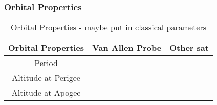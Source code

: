 \documentclass[Space3_Assign1.tex]{subfiles}
\begin{document}
\subsubsection{Orbital Properties}
\begin{table}[h]
\centering
\caption{Orbital Properties - maybe put in classical parameters}
\begin{tabular}{|c|c|c|}
\hline
Orbital Properties & Van Allen Probe & Other sat \\\hline
Period & & \\\hline
Altitude at Perigee & & \\\hline
Altitude at Apogee & & \\\hline

\end{tabular}
\end{table}
\end{document}
